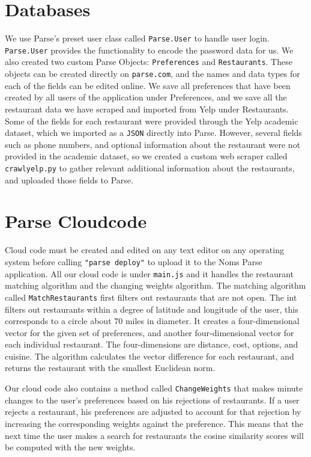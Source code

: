 \documentclass[12pt]{article}
\begin{document}
\section{Databases}
We use Parse's preset user class called \texttt{Parse.User} to handle user login. \texttt{Parse.User} provides the functionality to encode the password data for us.  We also created two custom Parse Objects: \texttt{Preferences} and \texttt{Restaurants}. These objects can be created directly on \texttt{parse.com}, and the names and data types for each of the fields can be edited online.  We save all preferences that have been created by all users of the application under Preferences, and we save all the restaurant data we have scraped and imported from Yelp under Restaurants.
Some of the fields for each restaurant were provided through the Yelp academic dataset, which we imported as a \texttt{JSON} directly into Parse.  However, several fields such as phone numbers, and optional information about the restaurant were not provided in the academic dataset, so we created a custom web scraper called \texttt{crawlyelp.py} to gather relevant additional information about the restaurants, and uploaded those fields to Parse.

\section{Parse Cloudcode}
Cloud code must be created and edited on any text editor on any operating system before calling \texttt{"parse deploy"} to upload it to the Noms Parse application.  All our cloud code is under \texttt{main.js} and it handles the restaurant matching algorithm and the changing weights algorithm. The matching algorithm called \texttt{MatchRestaurants} first filters out restaurants that are not open. The int filters out restaurants within a degree of latitude and longitude of the user, this corresponds to a circle about 70 miles in diameter. It creates a four-dimensional vector for the given set of preferences, and another four-dimensional vector for each individual restaurant.  The four-dimensions are distance, cost, options, and cuisine. The algorithm calculates the vector difference for each restaurant, and returns the restaurant with the smallest Euclidean norm.

Our cloud code also contains a method called \texttt{ChangeWeights} that makes minute changes to the user's preferences based on his rejections of restaurants.  If a user rejects a restaurant, his preferences are adjusted to account for that rejection by increasing the corresponding weights against the preference. This means that the next time the user makes a search for restaurants the cosine similarity scores will be computed with the new weights.
\end{document}
